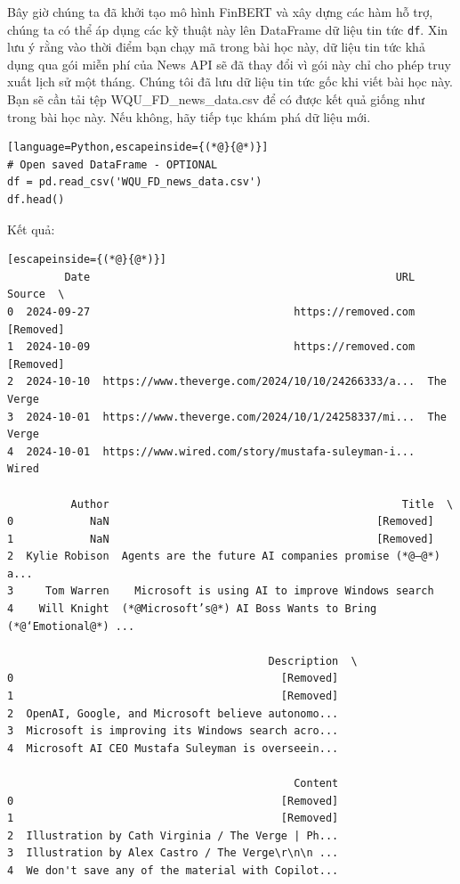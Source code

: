 Bây giờ chúng ta đã khởi tạo mô hình FinBERT và xây dựng các hàm hỗ trợ, chúng ta có thể áp dụng các kỹ thuật này lên DataFrame dữ liệu tin tức \texttt{df}. Xin lưu ý rằng vào thời điểm bạn chạy mã trong bài học này, dữ liệu tin tức khả dụng qua gói miễn phí của News API sẽ đã thay đổi vì gói này chỉ cho phép truy xuất lịch sử một tháng. Chúng tôi đã lưu dữ liệu tin tức gốc khi viết bài học này. Bạn sẽ cần tải tệp \textquotesingle WQU\_FD\_news\_data.csv\textquotesingle{} để có được kết quả giống như trong bài học này. Nếu không, hãy tiếp tục khám phá dữ liệu mới.

\begin{lstlisting}[language=Python,escapeinside={(*@}{@*)}]
# Open saved DataFrame - OPTIONAL
df = pd.read_csv('WQU_FD_news_data.csv')
df.head()
\end{lstlisting}

Kết quả:

\begin{lstlisting}[escapeinside={(*@}{@*)}]
         Date                                                URL     Source  \
0  2024-09-27                                https://removed.com  [Removed]   
1  2024-10-09                                https://removed.com  [Removed]   
2  2024-10-10  https://www.theverge.com/2024/10/10/24266333/a...  The Verge   
3  2024-10-01  https://www.theverge.com/2024/10/1/24258337/mi...  The Verge   
4  2024-10-01  https://www.wired.com/story/mustafa-suleyman-i...      Wired   

          Author                                              Title  \
0            NaN                                          [Removed]   
1            NaN                                          [Removed]   
2  Kylie Robison  Agents are the future AI companies promise (*@—@*) a...   
3     Tom Warren    Microsoft is using AI to improve Windows search   
4    Will Knight  (*@Microsoft’s@*) AI Boss Wants to Bring (*@‘Emotional@*) ...   

                                         Description  \
0                                          [Removed]   
1                                          [Removed]   
2  OpenAI, Google, and Microsoft believe autonomo...   
3  Microsoft is improving its Windows search acro...   
4  Microsoft AI CEO Mustafa Suleyman is overseein...   

                                             Content  
0                                          [Removed]  
1                                          [Removed]  
2  Illustration by Cath Virginia / The Verge | Ph...  
3  Illustration by Alex Castro / The Verge\r\n\n ...  
4  We don't save any of the material with Copilot...
\end{lstlisting}

